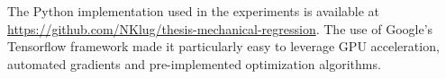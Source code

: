 The Python implementation used in the experiments is available at \url{https://github.com/NKlug/thesis-mechanical-regression}.
The use of Google's Tensorflow framework \cite{tensorflow15} made it particularly easy to leverage GPU acceleration, automated gradients and pre-implemented optimization algorithms.
